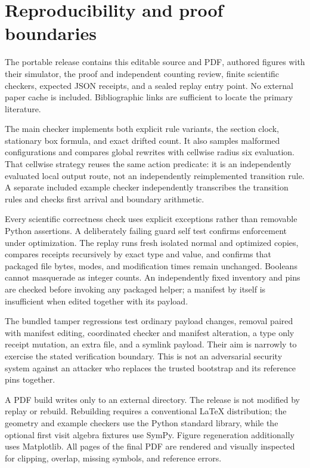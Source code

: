 \documentclass[11pt,letterpaper]{article}
\numberwithin{equation}{section}
\theoremstyle{definition}
\theoremstyle{remark}
\begin{document}
\section{Reproducibility and proof boundaries}\label{smc:og:sec:reproduction}
The portable release contains this editable source and PDF, authored figures with their simulator, the proof and independent counting review, finite scientific checkers, expected JSON receipts, and a sealed replay entry point. No external paper cache is included. Bibliographic links are sufficient to locate the primary literature.

The main checker implements both explicit rule variants, the section clock, stationary box formula, and exact drifted count. It also samples malformed configurations and compares global rewrites with cellwise radius six evaluation. That cellwise strategy reuses the same action predicate: it is an independently evaluated local output route, not an independently reimplemented transition rule. A separate included example checker independently transcribes the transition rules and checks first arrival and boundary arithmetic.

Every scientific correctness check uses explicit exceptions rather than removable Python assertions. A deliberately failing guard self test confirms enforcement under optimization. The replay runs fresh isolated normal and optimized copies, compares receipts recursively by exact type and value, and confirms that packaged file bytes, modes, and modification times remain unchanged. Booleans cannot masquerade as integer counts. An independently fixed inventory and pins are checked before invoking any packaged helper; a manifest by itself is insufficient when edited together with its payload.

The bundled tamper regressions test ordinary payload changes, removal paired with manifest editing, coordinated checker and manifest alteration, a type only receipt mutation, an extra file, and a symlink payload. Their aim is narrowly to exercise the stated verification boundary. This is not an adversarial security system against an attacker who replaces the trusted bootstrap and its reference pins together.

A PDF build writes only to an external directory. The release is not modified by replay or rebuild. Rebuilding requires a conventional \LaTeX{} distribution; the geometry and example checkers use the Python standard library, while the optional first visit algebra fixtures use SymPy. Figure regeneration additionally uses Matplotlib. All pages of the final PDF are rendered and visually inspected for clipping, overlap, missing symbols, and reference errors.
\end{document}

